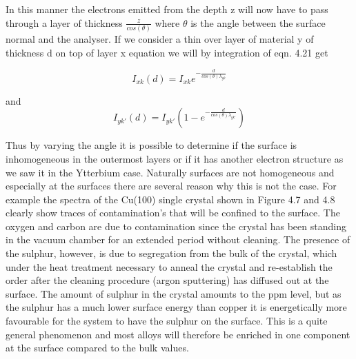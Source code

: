    In this manner the electrons emitted from
          the depth z will now have to pass through a layer of
          thickness $\frac{z}{cos(\theta)}$ where $\theta$ is the
          angle between the surface normal and the analyser. If
          we consider a thin over layer of material y of thickness
          d on top of layer x equation we will by integration of eqn.
          4.21 get 

            \begin{equation}
           I_{xk}(d)  =  I_{xk}e^{-\frac{d}{cos(\theta)\lambda_{yk}}}
          \end{equation}

          and \begin{equation}
           I_{yk'}(d)  =  I_{yk'}(1-e^{-\frac{d}{cos(\theta)\lambda_{yk'}}})
          \end{equation}

Thus by varying the angle it is possible to determine if
          the surface is inhomogeneous in the outermost layers or if
          it has another electron structure as we saw it in the
          Ytterbium case. Naturally surfaces are not homogeneous and
          especially at the surfaces there are several reason why this
          is not the case. For example the spectra of the Cu(100)
          single crystal shown in Figure 4.7 and 4.8 clearly show
          traces of contamination's that will be confined to the
          surface. The oxygen and carbon are due to contamination
          since the crystal has been standing in the vacuum chamber
          for an extended period without cleaning. The presence of the
          sulphur, however, is due to segregation from the bulk of the
          crystal, which under the heat treatment necessary to anneal
          the crystal and re-establish the order after the cleaning
          procedure (argon sputtering) has diffused out at the
          surface. The amount of sulphur in the crystal amounts to the
          ppm level, but as the sulphur has a much lower surface
          energy than copper it is energetically more favourable for
          the system to have the sulphur on the surface. This is a
          quite general phenomenon and most alloys will therefore be
          enriched in one component at the surface compared to the
          bulk values. 







